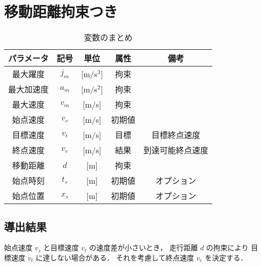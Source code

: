 \documentclass[a5paper]{ltjsarticle}
\begin{document}
\clearpage
\section{移動距離拘束つき}
\begin{table}[htbp]
    \centering
    \caption{変数のまとめ}
    \begin{tabular}{c|c|c|c|c}
        パラメータ & 記号  & 単位        & 属性   & 備考             \\ \hline\hline
        最大躍度   & $j_m$ & [m/s${}^3$] & 拘束   &                  \\
        最大加速度 & $a_m$ & [m/s${}^2$] & 拘束   &                  \\
        最大速度   & $v_m$ & [m/s]       & 拘束   &                  \\
        始点速度   & $v_s$ & [m/s]       & 初期値 &                  \\
        目標速度   & $v_t$ & [m/s]       & 目標   & 目標終点速度     \\
        終点速度   & $v_e$ & [m/s]       & 結果   & 到達可能終点速度 \\
        移動距離   & $d$   & [m]         & 拘束   &                  \\
        始点時刻   & $t_s$ & [m]         & 初期値 & オプション       \\
        始点位置   & $x_s$ & [m]         & 初期値 & オプション       \\
    \end{tabular}
\end{table}

\subsection{導出結果}
始点速度 $v_s$ と目標速度 $v_t$ の速度差が小さいとき，
走行距離 $d$ の拘束により
目標速度 $v_t$ に達しない場合がある．
それを考慮して終点速度 $v_e$ を決定する．
\end{document}
